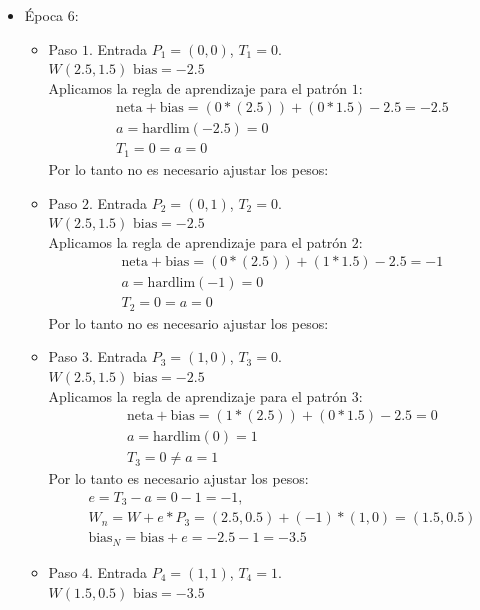 \documentclass{article}
\begin{document}
{{\begin{itemize}
\item Época 6:
\begin{itemize}
\item Paso $1$. Entrada $P_1 = (0, 0)$, $T_1 = 0$. \\
$W(2.5, 1.5)$  $\text{bias} = -2.5$ \\

Aplicamos la regla de aprendizaje para el patrón $1$:
\begin{align*}
&\text{neta} + \text{bias}= (0 * (2.5)) + (0 * 1.5) - 2.5 = -2.5\\
&a = \text{hardlim}(-2.5) = 0 \\
&T_1 = 0 = a = 0
\end{align*}
Por lo tanto no es necesario ajustar los pesos:

\item Paso $2$. Entrada $P_2 = (0, 1)$, $T_2 = 0$. \\
$W(2.5, 1.5)$  $\text{bias} = -2.5$ \\

Aplicamos la regla de aprendizaje para el patrón $2$:
\begin{align*}
&\text{neta} + \text{bias}= (0 * (2.5)) + (1 * 1.5) - 2.5 = -1\\
&a = \text{hardlim}(-1) = 0 \\
&T_2 = 0 = a = 0
\end{align*}
Por lo tanto no es necesario ajustar los pesos:

\item Paso $3$. Entrada $P_3 = (1, 0)$, $T_3 = 0$. \\
$W(2.5, 1.5)$  $\text{bias} = -2.5$ \\

Aplicamos la regla de aprendizaje para el patrón $3$:
\begin{align*}
&\text{neta} + \text{bias}= (1 * (2.5)) + (0 * 1.5) - 2.5 = 0\\
&a = \text{hardlim}(0) = 1 \\
&T_3 = 0 \neq a = 1
\end{align*}
Por lo tanto es necesario ajustar los pesos:
\begin{align*}
&e = T_3 - a = 0- 1 =  -1, \\
&W_n = W + e* P_3 = (2.5, 0.5) + (-1) * (1,0) = (1.5, 0.5) \\
&\text{bias}_N = \text{bias} + e = -2.5 - 1 = -3.5
\end{align*}

\item Paso $4$. Entrada $P_4 = (1, 1)$, $T_4 = 1$. \\
$W(1.5, 0.5)$  $\text{bias} = -3.5$ \\


\end{itemize}
\end{itemize}}}
\end{document}
